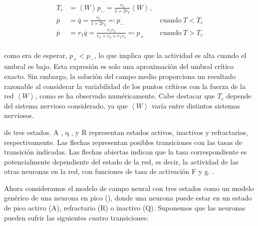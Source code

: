 \begin{equation}\label{eq:78}
	\begin{aligned}
		T_c &= \left\langle W\right\rangle p_{-} =\frac{r_2 }{1+2r_2}\left\langle W\right\rangle ,	\\
		\bar{p}&=\bar{q}=\frac{r_2}{1+2r_2} \eqqcolon p_{-} &\ \text{cuando} \ T<T_c \\
		\bar{p} &= r_1\bar{q} = \frac{r_1r_2}{r_1+r_2+r_1r_2}\eqqcolon p_{+} &\ \text{cuando} \ T>T_c\\
		\end{aligned}
\end{equation}

como era de esperar, $p_{+} < p_{-}$, lo que implica que la actividad es alta cuando el umbral es bajo. Esta expresión es solo una aproximación del umbral crítico exacto. Sin embargo, la solución del campo medio proporciona un resultado razonable al considerar la variabilidad de los puntos críticos con la fuerza de la red  $\left\langle W \right\rangle$, como se ha observado numéricamente. Cabe destacar que $T_c$ depende del sistema nervioso considerado, ya que  $\left\langle W \right\rangle$ varía entre distintos sistemas nerviosos.





de tres estados.  A , q , y  R representan estados activos, inactivos y refractarios, respectivamente. Las flechas representan posibles transiciones con las tasas de transición indicadas. Las flechas abiertas indican que la tasa correspondiente es potencialmente dependiente del estado de la red, es decir, la actividad de las otras neuronas en la red, con funciones de tasa de activación  F y  g.
.

Ahora consideramos el modelo de campo neural con tres estados como un modelo genérico de una neurona en pico (), donde una neurona puede estar en un estado de pico activo (A), refractario (R) o inactivo (Q). Suponemos que las neuronas pueden sufrir las siguientes cuatro transiciones:


